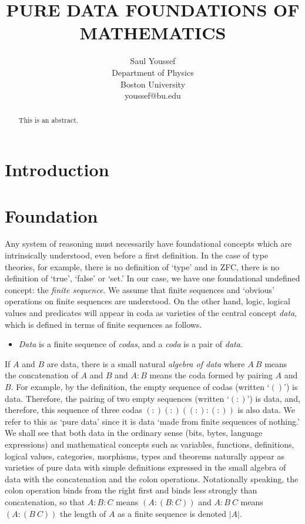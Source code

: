 \documentclass[11pt]{article}
\begin{document}
\title{\bf {PURE DATA FOUNDATIONS OF MATHEMATICS}}
\author{%
  Saul Youssef%
  \hfil \\
  Department of Physics \\
  Boston University \\
  youssef@bu.edu\\
}
\maketitle
\begin{abstract}
This is an abstract.
\end{abstract}

\section{Introduction}

\section{Foundation}

     Any system of reasoning must necessarily have foundational concepts which are intrinsically understood, even before a first definition.  
In the case of type theories, for example,
there is no definition of `type' and in ZFC, there is no definition of `true', `false' or `set.'  In our case, we have one foundational undefined concept:  
the {\it finite sequence}.  We assume that finite sequences and `obvious' operations on finite sequences are understood\cite{obvious}.  On the other hand, logic, 
logical values and predicates will appear in coda as varieties of the central concept {\it data}, which is defined in terms of finite sequences as follows. 
\begin{itemize}
\item {\it Data} is a finite sequence of {\it codas}, and a {\it coda} is a pair of {\it data}. 
\end{itemize}
If $A$ and $B$ are data, there is a small natural {\it algebra of data} where $A\ B$ means the concatenation of $A$ and $B$ and $A:B$ means 
the coda formed by pairing $A$ and $B$.  For example, by the definition, the empty sequence of codas (written `$()$') is data.  Therefore,
the pairing of two empty sequences (written `$(:)$') is data, and, therefore, this sequence of three codas $(:) (:) ((:):(:))$ is also data.  
We refer to this as `pure data' since it is data `made from finite sequences of nothing.'   
We shall see that both data in the ordinary sense (bits, bytes, language expressions) and mathematical concepts such as variables, functions, definitions, 
logical values, categories, morphisms, types and theorems naturally appear as varieties of pure data with simple definitions expressed in the small algebra
of data with the concatenation and the colon operations.   Notationally speaking, the colon operation binds from the right first and binds 
less strongly than concatenation, so that $A:B:C$ means $(A:(B:C))$ and $A:B\ C$ means $(A:(B\ C))$ the length of $A$ as a finite sequence 
is denoted $|A|$.  
\end{document}
